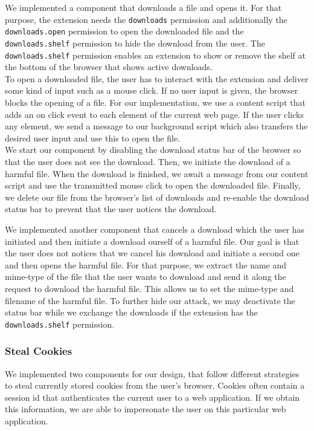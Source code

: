 	We implemented a component that downloads a file and opens it. For that purpose, the extension needs the \texttt{downloads} permission and additionally the \texttt{downloads.open} permission to open the downloaded file and the \texttt{downloads.shelf} permission to hide the download from the user. The \texttt{downloads.shelf} permission enables an extension to show or remove the shelf at the bottom of the browser that shows active downloads. \\
	To open a downloaded file, the user has to interact with the extension and deliver some kind of input such as a mouse click. If no user input is given, the browser blocks the opening of a file. For our implementation, we use a content script that adds an on click event to each element of the current web page. If the user clicks any element, we send a message to our background script which also transfers the desired user input and use this to open the file. \\
	We start our component by disabling the download status bar of the browser so that the user does not see the download. Then, we initiate the download of a harmful file. When the download is finished, we await a message from our content script and use the transmitted mouse click to open the downloaded file. Finally, we delete our file from the browser's list of downloads and re-enable the download status bar to prevent that the user notices the download.
	
	We implemented another component that cancels a download which the user has initiated and then initiate a download ourself of a harmful file. Our goal is that the user does not notices that we cancel his download and initiate a second one and then opens the harmful file. For that purpose, we extract the name and mime-type of the file that the user wants to download and send it along the request to download the harmful file. This allows us to set the mime-type and filename of the harmful file. To further hide our attack, we may deactivate the status bar while we exchange the downloads if the extension has the \texttt{downloads.shelf} permission. \\

\subsubsection{Steal Cookies}
\label{sec:stealCookies}

	We implemented two components for our design, that follow different strategies to steal currently stored cookies from the user's browser. Cookies often contain a session id that authenticates the current user to a web application. If we obtain this information, we are able to impersonate the user on this particular web application. 
	
